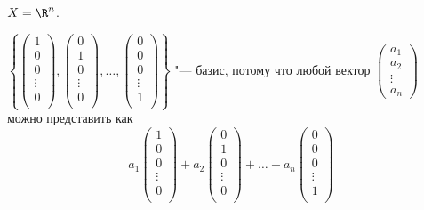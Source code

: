 \begin{exmp}
$X = \R^n$.

$
	\left\{
		\begin{pmatrix}
			1\\
			0\\
			0\\
			\vdots \\
			0\\
		\end{pmatrix},
		\begin{pmatrix}
			0\\
			1\\
			0\\
			\vdots \\
			0\\
		\end{pmatrix},
		\dots,
		\begin{pmatrix}
			0\\
			0\\
			0\\
			\vdots \\
			1\\
		\end{pmatrix}
	\right\}
$ "--- базис, потому что любой вектор
$
	\begin{pmatrix}
		a_1\\
		a_2\\
		\vdots \\
		a_n
	\end{pmatrix}
$ можно представить как
\[
	a_1
	\begin{pmatrix}
		1\\
		0\\
		0\\
		\vdots \\
		0\\
	\end{pmatrix}
	+a_2
	\begin{pmatrix}
		0\\
		1\\
		0\\
		\vdots \\
		0\\
	\end{pmatrix}
	+\dots
	+a_n
	\begin{pmatrix}
		0\\
		0\\
		0\\
		\vdots \\
		1\\
	\end{pmatrix}
\]
\end{exmp}

